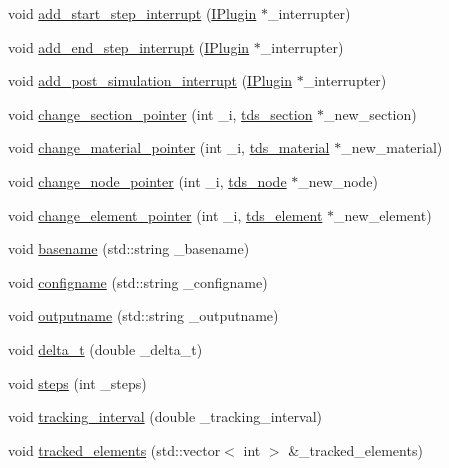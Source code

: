 \begin{DoxyCompactItemize}
\item 
void \hyperlink{classtds__run_a53af820867a6889a0f992747b025e960}{add\+\_\+start\+\_\+step\+\_\+interrupt} (\hyperlink{classIPlugin}{I\+Plugin} $\ast$\+\_\+interrupter)
\item 
void \hyperlink{classtds__run_ac0c00ed2b05ebefed18ffd4d1df9d939}{add\+\_\+end\+\_\+step\+\_\+interrupt} (\hyperlink{classIPlugin}{I\+Plugin} $\ast$\+\_\+interrupter)
\item 
void \hyperlink{classtds__run_ab00abee313469532a8ab080aca7bd646}{add\+\_\+post\+\_\+simulation\+\_\+interrupt} (\hyperlink{classIPlugin}{I\+Plugin} $\ast$\+\_\+interrupter)
\item 
void \hyperlink{classtds__run_a9374772ea6de814d7dfded259832f6b6}{change\+\_\+section\+\_\+pointer} (int \+\_\+i, \hyperlink{classtds__section}{tds\+\_\+section} $\ast$\+\_\+new\+\_\+section)
\item 
void \hyperlink{classtds__run_a03691796a9eebdfbf5bc65e5b705254c}{change\+\_\+material\+\_\+pointer} (int \+\_\+i, \hyperlink{classtds__material}{tds\+\_\+material} $\ast$\+\_\+new\+\_\+material)
\item 
void \hyperlink{classtds__run_a682cac3d47e4b6ed3e005d37041db08b}{change\+\_\+node\+\_\+pointer} (int \+\_\+i, \hyperlink{classtds__node}{tds\+\_\+node} $\ast$\+\_\+new\+\_\+node)
\item 
void \hyperlink{classtds__run_adfce89e41fb6ffe66fbbcb3dadcf101a}{change\+\_\+element\+\_\+pointer} (int \+\_\+i, \hyperlink{classtds__element}{tds\+\_\+element} $\ast$\+\_\+new\+\_\+element)
\item 
void \hyperlink{classtds__run_a43fa7246bfeda6b5e30e7064c798ce44}{basename} (std\+::string \+\_\+basename)
\item 
void \hyperlink{classtds__run_af835c5821513196c95ea1aa8843b7c4d}{configname} (std\+::string \+\_\+configname)
\item 
void \hyperlink{classtds__run_ab915e669b626f046e452bc8986dc2745}{outputname} (std\+::string \+\_\+outputname)
\item 
void \hyperlink{classtds__run_a3c6f314b5abe50031704b3993624ac98}{delta\+\_\+t} (double \+\_\+delta\+\_\+t)
\item 
void \hyperlink{classtds__run_a3ef12a27264daabbce95d66a05a1783f}{steps} (int \+\_\+steps)
\item 
void \hyperlink{classtds__run_af6c0667d9868be944a1d3e5880609f8a}{tracking\+\_\+interval} (double \+\_\+tracking\+\_\+interval)
\item 
void \hyperlink{classtds__run_a555ffb37cdd6f1a9b877ae4b3be32acb}{tracked\+\_\+elements} (std\+::vector$<$ int $>$ \&\+\_\+tracked\+\_\+elements)

\end{DoxyCompactItemize}
